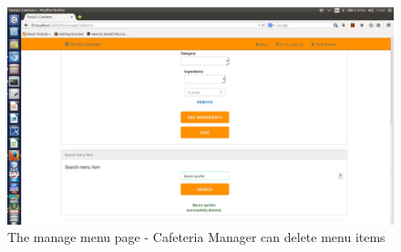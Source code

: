 \documentclass[a4paper,12pt]{report}
\begin{document}
\begin{figure}[H]
  \centering
    \includegraphics[width=1.0\textwidth]{screenshots/deleteMenu.png}
    \caption{The manage menu page - Cafeteria Manager can delete menu items}
\end{figure}
\end{document}

